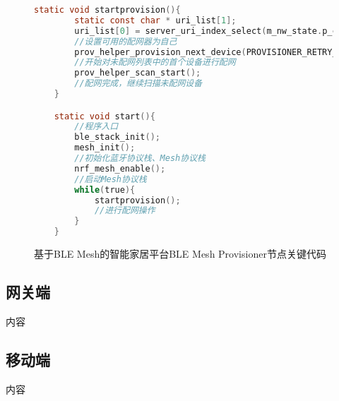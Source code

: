 \begin{figure}[H]
    \centering
    \begin{lstlisting}[language=C]
    static void startprovision(){
        static const char * uri_list[1];
        uri_list[0] = server_uri_index_select(m_nw_state.p_client_uri);
        //设置可用的配网器为自己
        prov_helper_provision_next_device(PROVISIONER_RETRY_COUNT, m_nw_state.next_device_address, uri_list, ARRAY_SIZE(uri_list));
        //开始对未配网列表中的首个设备进行配网
        prov_helper_scan_start();
        //配网完成，继续扫描未配网设备
    }

    static void start(){
        //程序入口
        ble_stack_init();
        mesh_init();
        //初始化蓝牙协议栈、Mesh协议栈
        nrf_mesh_enable();
        //启动Mesh协议栈
        while(true){
            startprovision();
            //进行配网操作
        }
    }
    \end{lstlisting}
    \caption{基于BLE Mesh的智能家居平台BLE Mesh Provisioner节点关键代码}
    \label{fig:code_mesh_provisioner}
\end{figure}


\subsection{网关端}
内容

\subsection{移动端}
内容
